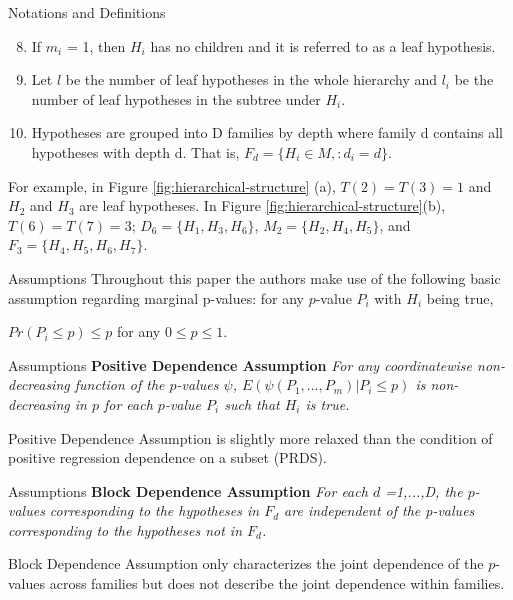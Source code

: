 \documentclass{beamer}
\begin{document}
\begin{frame}[t]{Notations and Definitions}\vspace{10pt}
\begin{enumerate}
	\setcounter{enumi}{7}
    \item If $m_i$ = 1, then $H_i$ has no children and it is referred to as a leaf hypothesis.
    \item Let $l$ be the number of leaf hypotheses in the whole hierarchy and $l_i$ be the number of leaf hypotheses in the subtree under $H_i$.
    \item Hypotheses are grouped into D families by depth where
    family d contains all hypotheses with depth d. That is, $F_d = \{H_i \in M,: d_i = d\}$.
\end{enumerate}
For example, in Figure \ref{fig:hierarchical-structure} (a), $T(2) = T(3) = 1$ and $H_2$ and $H_3$ are leaf hypotheses. In Figure \ref{fig:hierarchical-structure}(b),
$T(6) = T(7) = 3$; $D_6 = \{H_1,H_3,H_6\}$, $M_2 = \{H_2, H_4, H_5\}$, and $F_3 = \{H_4,H_5,H_6,H_7\}$.
\end{frame}


\begin{frame}[t]{Assumptions}\vspace{10pt}
Throughout this paper the authors make use of the following basic assumption regarding marginal p-values: for any $p$-value $P_i$ with $H_i$ being true,
\begin{center}
	$Pr(P_i \leq p) \leq p$ for any $0 \leq p \leq 1$. 
	
\end{center}	
\end{frame}

\begin{frame}[t]{Assumptions}\vspace{10pt}
\textbf{Positive Dependence Assumption}
\textit{For any coordinatewise non-decreasing function of the $p$-values $\psi$, $E(\psi(P_1,...,P_m)|P_i \leq p)$ is non-decreasing in $p$ for each $p$-value $P_i$ such that $H_i$ is true.}

Positive Dependence Assumption is slightly more relaxed than the condition of positive regression dependence on a subset (PRDS).
\end{frame}

\begin{frame}[t]{Assumptions}\vspace{10pt}
\textbf{Block Dependence Assumption}
\textit{For each $d$ =1,...,D, the $p$-values corresponding to the hypotheses in $F_d$ are independent of the p-values corresponding to the hypotheses not in $F_d$.}

Block Dependence Assumption only characterizes the joint dependence of the $p$-values across families but does not describe the joint dependence within families.
\end{frame}
\end{document}
